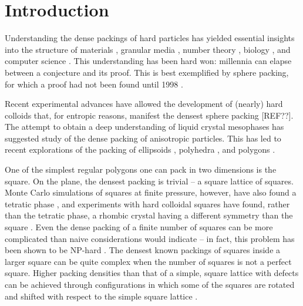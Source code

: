 \section{Introduction}

Understanding the dense packings of hard particles has yielded essential insights into the structure of materials \cite{Bernal2007} \cite{Zallen1983} \cite{Torquato2002} \cite{Chaikin2000}, granular media \cite{Torquato2002} \cite{Mehta1994}, number theory \cite{Cohn2008} \cite{Conway1999}, biology 
\cite{Gevertz2008} \cite{Purohit2003}, and computer science \cite{Johnson1974} \cite{Lodi2002}. This understanding has been hard won: millennia can elapse between a conjecture and its proof. This is best exemplified by sphere packing, for which a proof had not been found until 1998 \cite{Hales2011}.


Recent experimental advances have allowed the development of (nearly) hard colloids that, for entropic reasons, manifest the densest sphere packing [REF??]. The attempt to obtain a deep understanding of liquid crystal mesophases has suggested study of the dense packing of anisotropic particles. This has led to recent explorations of the packing of ellipsoids \cite{Donev2004}, polyhedra \cite{ROAN} \cite{BAKER}, and polygons \cite{Jansson2006} \cite{STROOBANTS}.

One of the simplest regular polygons one can pack in two dimensions is the square. On the plane, the densest packing is trivial -- a square lattice of squares. Monte Carlo simulations of squares at finite pressure, however, have also found a tetratic phase \cite{Donev2006b}, and experiments with hard colloidal squares have found, rather than the tetratic phase, a rhombic crystal having a different symmetry than the square \cite{Zhao2011}. Even the dense packing of a finite number of squares can be more complicated than naive considerations would indicate -- in fact, this problem has been shown to be NP-hard \cite{Leung1990}. The densest known packings of squares inside a larger square can be quite complex \cite{ERDOS1975} \cite{Friedman2002} when the number of squares is not a perfect square. Higher packing densities than that of a simple, square lattice with defects can be achieved through configurations in which some of the squares are rotated and shifted with respect to the simple square lattice \cite{Friedman2002}.

